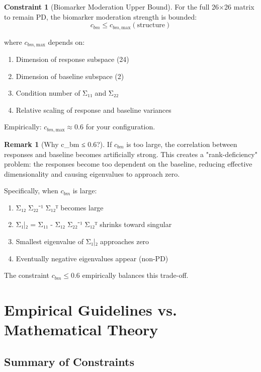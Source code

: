 \documentclass[12pt,a4paper]{article}
\theoremstyle{definition}
\newtheorem{constraint}{Constraint}
\newtheorem{remark}{Remark}
\begin{document}
\begin{constraint}[Biomarker Moderation Upper Bound]
For the full 26×26 matrix to remain PD, the biomarker moderation strength is bounded:
\[
  c_{bm} \leq c_{bm,\text{max}}(\text{structure})
\]

where $c_{bm,\text{max}}$ depends on:
\begin{enumerate}
  \item Dimension of response subspace (24)
  \item Dimension of baseline subspace (2)
  \item Condition number of Σ₁₁ and Σ₂₂
  \item Relative scaling of response and baseline variances
\end{enumerate}

Empirically: $c_{bm,\text{max}} \approx 0.6$ for your configuration.
\end{constraint}

\begin{remark}[Why c_bm ≤ 0.6?]
If $c_{bm}$ is too large, the correlation between responses and baseline becomes artificially strong. This creates a "rank-deficiency" problem: the responses become too dependent on the baseline, reducing effective dimensionality and causing eigenvalues to approach zero.

Specifically, when $c_{bm}$ is large:
\begin{enumerate}
  \item Σ₁₂ Σ₂₂⁻¹ Σ₁₂ᵀ becomes large
  \item Σ₁|₂ = Σ₁₁ - Σ₁₂ Σ₂₂⁻¹ Σ₁₂ᵀ shrinks toward singular
  \item Smallest eigenvalue of Σ₁|₂ approaches zero
  \item Eventually negative eigenvalues appear (non-PD)
\end{enumerate}

The constraint $c_{bm} ≤ 0.6$ empirically balances this trade-off.
\end{remark}

\section{Empirical Guidelines vs. Mathematical Theory}

\subsection{Summary of Constraints}
\end{document}

